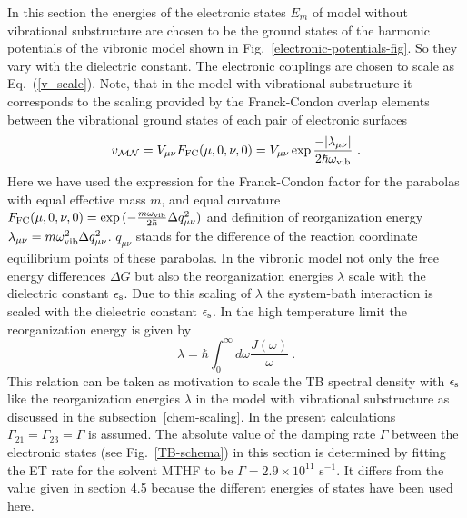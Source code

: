 \documentclass[12pt,twoside,a4paper]{report}
\begin{document}
In this section 
the energies of the electronic states $E_m$ 
of model without vibrational substructure 
are chosen to 
be the ground states of the harmonic potentials 
of the vibronic model shown in Fig.~\ref{electronic-potentials-fig}.
So they vary with the dielectric constant. 
The  electronic couplings
 are chosen to 
scale as Eq.~(\ref{v_scale}).
Note, that in the model with vibrational substructure it corresponds to the scaling provided by
the Franck-Condon overlap elements between the vibrational ground
states of each pair of electronic surfaces
\begin{equation}
  \label{argument}
v_{\cal{M} \cal{N}}
       =
          V_{\mu \nu}
          F_{\rm FC}(\mu,0,\nu,0)
       =
          V_{\mu \nu}
          \exp{
             \frac
                  {-|\lambda_{\mu \nu}|}
                  {2 \hbar \omega_{\rm vib}}
               }~.
  \end{equation}
Here we have used the expression
for the Franck-Condon factor 
for the parabolas with equal effective mass $m$,
and equal curvature
$F
 _{\rm FC}
 (\mu,0,\nu,0)
              =
                 \exp{( 
                       -  \frac
                               {m  \omega
                                   _{\rm vib}
                               }
                               {2  \hbar}
                          \Delta q_{\mu \nu}^2
                     )}$
and definition of reorganization energy
$\lambda
  _{\mu 
    \nu}
            =
                 m \omega
                   _{\rm vib}
                   ^2 
                 \Delta 
                 q
                 _{\mu \nu}
                 ^2$.
$q_{\mu \nu}$ stands for the difference of the 
reaction coordinate equilibrium points
of these parabolas.
  In the vibronic model not only the free energy differences $\Delta
  G$ but also the reorganization energies $\lambda$ scale with the
  dielectric constant $\epsilon_{\rm s}$.  Due to this scaling of
  $\lambda$ the system-bath interaction is scaled with the dielectric
  constant $\epsilon_{\rm s}$. In the high temperature limit the
  reorganization energy is given by \cite{weis99}
\begin{equation}
  \label{4}
  \lambda 
           =
              \hbar 
              \int_0^{\infty} d\omega
                  \frac
                     {J(\omega)}
                     {\omega}~.
\end{equation}
This relation can be  taken as motivation to
 scale the TB spectral density
with  $\epsilon_{\rm s}$ like the reorganization energies $\lambda$
in the model with vibrational substructure as discussed in the subsection~\ref{chem-scaling}. 
In the present calculations
$\Gamma_{21}=\Gamma_{23}=\Gamma$ is assumed. 
The absolute value of the damping rate $\Gamma$ between the 
electronic states  (see Fig.~\ref{TB-schema}) 
in this section
is determined by fitting the ET
rate for the solvent MTHF to be $\Gamma=2.9\times{}10^{11}$ s$^{-1}$.
It differs from the value given in section 4.5
because the different energies of states 
have been used here.
\end{document}
